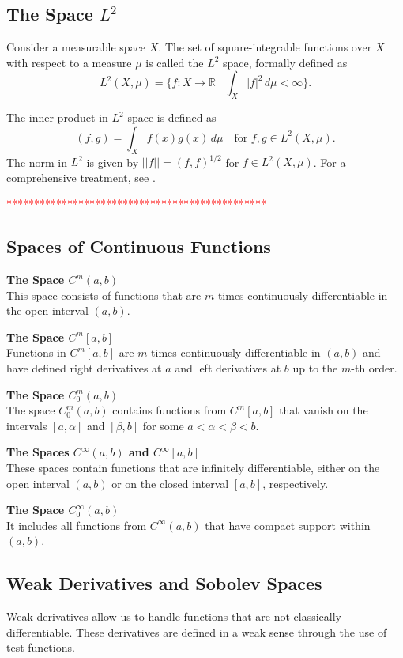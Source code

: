 \documentclass[../../main.tex]{subfiles}
\begin{document}
\subsection*{The Space \( L^2 \)}
Consider a measurable space \( X \). The set of square-integrable functions over \( X \) with respect to a measure \( \mu \) is called the \( L^2 \) space, formally defined as
\[ L^2(X, \mu) = \{ f: X \to \mathbb{R} \mid \int_X |f|^2 \, d\mu < \infty \}. \]

The inner product in \( L^2 \) space is defined as
\[ (f,g) = \int_X f(x)g(x) \, d\mu \quad \text{for } f, g \in L^2(X, \mu). \]
The norm in \( L^2 \) is given by \( ||f|| = (f,f)^{1/2} \) for \( f \in L^2(X, \mu) \). For a comprehensive treatment, see \cite{Rud53}.

\textcolor{red}{***********************************************}

\subsection*{Spaces of Continuous Functions}

\textbf{The Space \( C^m(a,b) \)}\\
This space consists of functions that are \( m \)-times continuously differentiable in the open interval \( (a, b) \).

\textbf{The Space \( C^m[a,b] \)}\\
Functions in \( C^m[a,b] \) are \( m \)-times continuously differentiable in \( (a, b) \) and have defined right derivatives at \( a \) and left derivatives at \( b \) up to the \( m \)-th order.

\textbf{The Space \( C_0^m(a,b) \)}\\
The space \( C_0^m(a,b) \) contains functions from \( C^m[a,b] \) that vanish on the intervals \( [a, \alpha] \) and \( [\beta, b] \) for some \( a < \alpha < \beta < b \).

\textbf{The Spaces \( C^\infty(a,b) \) and \( C^\infty[a,b] \)}\\
These spaces contain functions that are infinitely differentiable, either on the open interval \( (a, b) \) or on the closed interval \( [a, b] \), respectively.

\textbf{The Space \( C_0^\infty(a,b) \)}\\
It includes all functions from \( C^\infty(a,b) \) that have compact support within \( (a, b) \).

\subsection*{Weak Derivatives and Sobolev Spaces}
Weak derivatives allow us to handle functions that are not classically differentiable. These derivatives are defined in a weak sense through the use of test functions.
\end{document}
